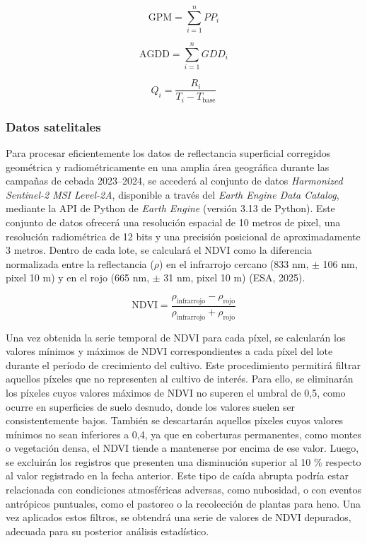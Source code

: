 \documentclass[
11pt, %
]{charter}
\begin{document}
\begin{equation}
\label{eq:GPM}
\text{GPM} = \sum_{i=1}^{n} PP_{i}
\end{equation}

\begin{equation}
\label{eq:AGDD}
\text{AGDD} = \sum_{i=1}^{n} GDD_{i}
\end{equation}

\begin{equation}
\label{eq:Q}
Q_i = \frac{R_i}{T_i - T_{\text{base}}}
\end{equation}


\subsubsection{Datos satelitales}
\label{sec:descripcion}

Para procesar eficientemente los datos de reflectancia superficial corregidos geométrica y radiométricamente en una amplia área geográfica durante las campañas de cebada 2023–2024, se accederá al conjunto de datos \textit{Harmonized Sentinel-2 MSI Level-2A}, disponible a través del \textit{Earth Engine Data Catalog}, mediante la API de Python de \textit{Earth Engine} (versión 3.13 de Python). Este conjunto de datos ofrecerá una resolución espacial de 10 metros de pixel, una resolución radiométrica de 12 bits y una precisión posicional de aproximadamente 3 metros. Dentro de cada lote, se calculará el NDVI  como
la diferencia normalizada entre la reflectancia ($\rho$) en el infrarrojo cercano (833 nm, $\pm$ 106 nm, pixel 10 m) y en el rojo (665 nm, $\pm$ 31 nm, pixel 10 m) (ESA, 2025). 

\begin{equation}
\text{NDVI} = \frac{\rho_{\text{infrarrojo}} - \rho_{\text{rojo}}}{\rho_{\text{infrarrojo}} + \rho_{\text{rojo}}} \label{eq:ndvi_def}
\end{equation}

Una vez obtenida la serie temporal de NDVI para cada píxel, se calcularán los valores mínimos y máximos de NDVI correspondientes a cada píxel del lote durante el período de crecimiento del cultivo. Este procedimiento permitirá filtrar aquellos píxeles que no representen al cultivo de interés. Para ello, se eliminarán los píxeles cuyos valores máximos de NDVI no superen el umbral de 0,5, como ocurre en superficies de suelo desnudo, donde los valores suelen ser consistentemente bajos. También se descartarán aquellos píxeles cuyos valores mínimos no sean inferiores a 0,4, ya que en coberturas permanentes, como montes o vegetación densa, el NDVI tiende a mantenerse por encima de ese valor. Luego, se excluirán los registros que presenten una disminución superior al 10 \% respecto al valor registrado en la fecha anterior. Este tipo de caída abrupta podría estar relacionada con condiciones atmosféricas adversas, como nubosidad, o con eventos antrópicos puntuales, como el pastoreo o la recolección de plantas para heno. Una vez aplicados estos filtros, se obtendrá una serie de valores de NDVI depurados, adecuada para su posterior análisis estadístico.
\end{document}
